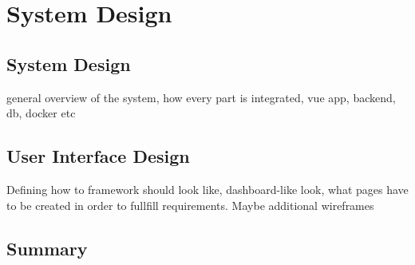 \chapter[System Design]{System Design}

\section{System Design}
general overview of the system, how every part is integrated, vue app, backend, db, docker etc

\section{User Interface Design}
Defining how to framework should look like, dashboard-like look, what pages have to be created in order to fullfill requirements. Maybe additional wireframes

\section{Summary}